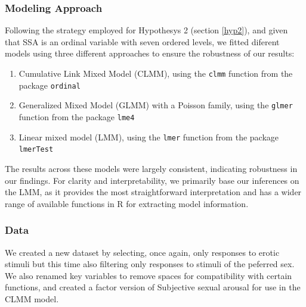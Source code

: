 \documentclass[
  bookmarksnumbered]{article}
\providecommand{\tightlist}{%
  \setlength{\itemsep}{0pt}\setlength{\parskip}{0pt}}
\begin{document}
\subsubsection{Modeling Approach}\label{modeling-approach-1}

Following the strategy employed for Hypothesys 2 (section \ref{hyp2}), and given that SSA is an ordinal variable with seven ordered levels, we fitted diferent models using three different approaches to ensure the robustness of our results:

\begin{enumerate}
\def\labelenumi{\arabic{enumi}.}
\tightlist
\item
  Cumulative Link Mixed Model (CLMM), using the \texttt{clmm} function from the package \texttt{ordinal} \autocite{ordinalcit}
\item
  Generalized Mixed Model (GLMM) with a Poisson family, using the \texttt{glmer} function from the package \texttt{lme4} \autocite{lme4cit}
\item
  Linear mixed model (LMM), using the \texttt{lmer} function from the package \texttt{lmerTest} \autocite{lmertestcit}
\end{enumerate}

The results across these models were largely consistent, indicating robustness in our findings. For clarity and interpretability, we primarily base our inferences on the LMM, as it provides the most straightforward interpretation and has a wider range of available functions in R for extracting model information.

\subsubsection{Data}\label{data-2}

We created a new dataset by selecting, once again, only responses to erotic stimuli but this time also filtering only responses to stimuli of the peferred sex. We also renamed key variables to remove spaces for compatibility with certain functions, and created a factor version of Subjective sexual arousal for use in the CLMM model.
\end{document}
